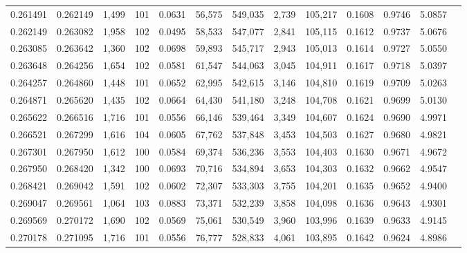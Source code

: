 \begin{tabular}{rrrrrrrrrrrrr}
0.261491 & 0.262149 & 1,499 & 101 &                                     0.0631 &  56,575 & 549,035 &   2,739 & 105,217 & 0.1608 & 0.9746 & 5.0857 \\
0.262149 & 0.263082 & 1,958 & 102 &                                     0.0495 &  58,533 & 547,077 &   2,841 & 105,115 & 0.1612 & 0.9737 & 5.0676 \\
0.263085 & 0.263642 & 1,360 & 102 &                                     0.0698 &  59,893 & 545,717 &   2,943 & 105,013 & 0.1614 & 0.9727 & 5.0550 \\
0.263648 & 0.264256 & 1,654 & 102 &                                     0.0581 &  61,547 & 544,063 &   3,045 & 104,911 & 0.1617 & 0.9718 & 5.0397 \\
0.264257 & 0.264860 & 1,448 & 101 &                                     0.0652 &  62,995 & 542,615 &   3,146 & 104,810 & 0.1619 & 0.9709 & 5.0263 \\
0.264871 & 0.265620 & 1,435 & 102 &                                     0.0664 &  64,430 & 541,180 &   3,248 & 104,708 & 0.1621 & 0.9699 & 5.0130 \\
0.265622 & 0.266516 & 1,716 & 101 &                                     0.0556 &  66,146 & 539,464 &   3,349 & 104,607 & 0.1624 & 0.9690 & 4.9971 \\
0.266521 & 0.267299 & 1,616 & 104 &                                     0.0605 &  67,762 & 537,848 &   3,453 & 104,503 & 0.1627 & 0.9680 & 4.9821 \\
0.267301 & 0.267950 & 1,612 & 100 &                                     0.0584 &  69,374 & 536,236 &   3,553 & 104,403 & 0.1630 & 0.9671 & 4.9672 \\
0.267950 & 0.268420 & 1,342 & 100 &                                     0.0693 &  70,716 & 534,894 &   3,653 & 104,303 & 0.1632 & 0.9662 & 4.9547 \\
0.268421 & 0.269042 & 1,591 & 102 &                                     0.0602 &  72,307 & 533,303 &   3,755 & 104,201 & 0.1635 & 0.9652 & 4.9400 \\
0.269047 & 0.269561 & 1,064 & 103 &                                     0.0883 &  73,371 & 532,239 &   3,858 & 104,098 & 0.1636 & 0.9643 & 4.9301 \\
0.269569 & 0.270172 & 1,690 & 102 &                                     0.0569 &  75,061 & 530,549 &   3,960 & 103,996 & 0.1639 & 0.9633 & 4.9145 \\
0.270178 & 0.271095 & 1,716 & 101 &                                     0.0556 &  76,777 & 528,833 &   4,061 & 103,895 & 0.1642 & 0.9624 & 4.8986 \\

\end{tabular}
